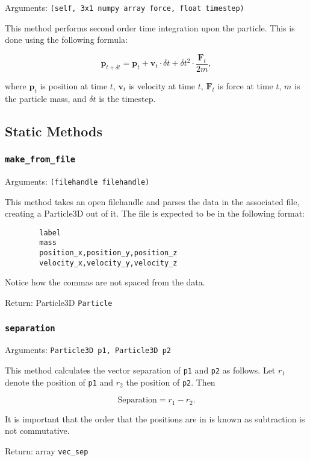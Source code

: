 \documentclass[a4paper, 11pt, british, left=1in, right=1in, top=0.3in, bottom=1in]{article}
\begin{document}
	Arguments: \texttt{(self, 3x1 numpy array force, float timestep)}
	
	This method performs second order time integration upon the particle. This is done using the following formula: 
	
	$$\textbf{p}_{t+\delta t} = \textbf{p}_t + \textbf{v}_t\cdot\delta t + \delta t^2 \cdot \frac{\textbf{F}_t}{2m},$$
	
	where $\textbf{p}_t$ is position at time $t$, $\textbf{v}_t$ is velocity at time $t$, $\textbf{F}_t$ is force at time $t$, $m$ is the particle mass, and $\delta t$ is the timestep. 
\pagebreak
	\subsection{Static Methods}
	
	\subsubsection{\texttt{make\_from\_file}}
	
	Arguments: \texttt{(filehandle filehandle)}
	
	This method takes an open filehandle and parses the data in the associated file, creating a Particle3D out of it. The file is expected to be in the following format:
	
	\begin{verbatim}
		label
		mass
		position_x,position_y,position_z
		velocity_x,velocity_y,velocity_z
	\end{verbatim}
	
	Notice how the commas are not spaced from the data.
	
	Return: Particle3D \texttt{Particle}
	
	\subsubsection{\texttt{separation}}
	
	Arguments: \texttt{Particle3D p1, Particle3D p2}
	
	This method calculates the vector separation of \texttt{p1} and \texttt{p2} as follows. Let $r_1$ denote the position of \texttt{p1} and $r_2$ the position of \texttt{p2}. Then
	
	$$\text{Separation} = r_1 - r_2.$$
	
	It is important that the order that the positions are in is known as subtraction is not commutative. 
	
	Return: array \texttt{vec\_sep}	
	
\end{document}

